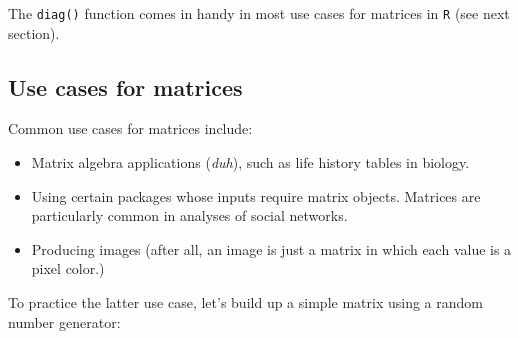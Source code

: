 \documentclass[
]{book}
\begin{document}
The \texttt{diag()} function comes in handy in most use cases for matrices in \texttt{R} (see next section).

\hypertarget{use-cases-for-matrices}{%
\subsection*{Use cases for matrices}\label{use-cases-for-matrices}}

Common use cases for matrices include:

\begin{itemize}
\item
  Matrix algebra applications (\emph{duh}), such as life history tables in biology.
\item
  Using certain packages whose inputs require matrix objects. Matrices are particularly common in analyses of social networks.
\item
  Producing images (after all, an image is just a matrix in which each value is a pixel color.)
\end{itemize}

To practice the latter use case, let's build up a simple matrix using a random number generator:
\end{document}
